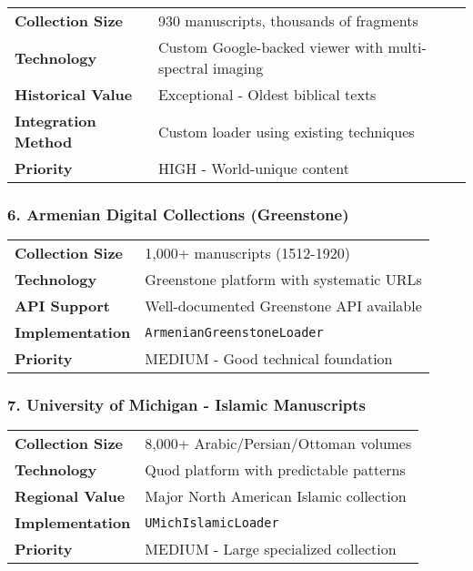 \documentclass[11pt,a4paper]{article}
\begin{document}
\begin{tabularx}{\textwidth}{lX}
\toprule
\textbf{Collection Size} & 930 manuscripts, thousands of fragments \\
\textbf{Technology} & Custom Google-backed viewer with multi-spectral imaging \\
\textbf{Historical Value} & \textcolor{success}{\faCrown{} Exceptional} - Oldest biblical texts \\
\textbf{Integration Method} & Custom loader using existing techniques \\
\textbf{Priority} & \textcolor{success}{\faStar{} HIGH} - World-unique content \\
\bottomrule
\end{tabularx}

\subsubsection{6. Armenian Digital Collections (Greenstone)}

\begin{tabularx}{\textwidth}{lX}
\toprule
\textbf{Collection Size} & 1,000+ manuscripts (1512-1920) \\
\textbf{Technology} & Greenstone platform with systematic URLs \\
\textbf{API Support} & Well-documented Greenstone API available \\
\textbf{Implementation} & \texttt{ArmenianGreenstoneLoader} \\
\textbf{Priority} & \textcolor{warning}{\faStar{} MEDIUM} - Good technical foundation \\
\bottomrule
\end{tabularx}

\subsubsection{7. University of Michigan - Islamic Manuscripts}

\begin{tabularx}{\textwidth}{lX}
\toprule
\textbf{Collection Size} & 8,000+ Arabic/Persian/Ottoman volumes \\
\textbf{Technology} & Quod platform with predictable patterns \\
\textbf{Regional Value} & Major North American Islamic collection \\
\textbf{Implementation} & \texttt{UMichIslamicLoader} \\
\textbf{Priority} & \textcolor{warning}{\faStar{} MEDIUM} - Large specialized collection \\
\bottomrule
\end{tabularx}
\end{document}
